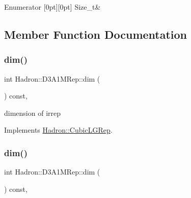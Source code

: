 \begin{DoxyEnumFields}{Enumerator}
[0pt][0pt]{}\mbox{\label{structHadron_1_1D3A1MRep_a2d9919ae83dfdc3bfd820a377dbb6aa5ad08f08a69bbf237ef9b1e9e5fc117854}} 
Size\+\_\+t&\\
\hline

\end{DoxyEnumFields}


\subsection{Member Function Documentation}
\mbox{\label{structHadron_1_1D3A1MRep_a312d820f56c251d8c64adff115dd1c50}} 
\subsubsection{\texorpdfstring{dim()}{dim()}\hspace{0.1cm}{\footnotesize\ttfamily [1/3]}}
{\footnotesize\ttfamily int Hadron\+::\+D3\+A1\+M\+Rep\+::dim (\begin{DoxyParamCaption}{ }\end{DoxyParamCaption}) const\hspace{0.3cm}{\ttfamily [inline]}, {\ttfamily [virtual]}}

dimension of irrep 

Implements \mbox{\hyperlink{structHadron_1_1CubicLGRep_a3acbaea26503ed64f20df693a48e4cdd}{Hadron\+::\+Cubic\+L\+G\+Rep}}.

\mbox{\label{structHadron_1_1D3A1MRep_a312d820f56c251d8c64adff115dd1c50}} 
\subsubsection{\texorpdfstring{dim()}{dim()}\hspace{0.1cm}{\footnotesize\ttfamily [2/3]}}
{\footnotesize\ttfamily int Hadron\+::\+D3\+A1\+M\+Rep\+::dim (\begin{DoxyParamCaption}{ }\end{DoxyParamCaption}) const\hspace{0.3cm}{\ttfamily [inline]}, {\ttfamily [virtual]}}

